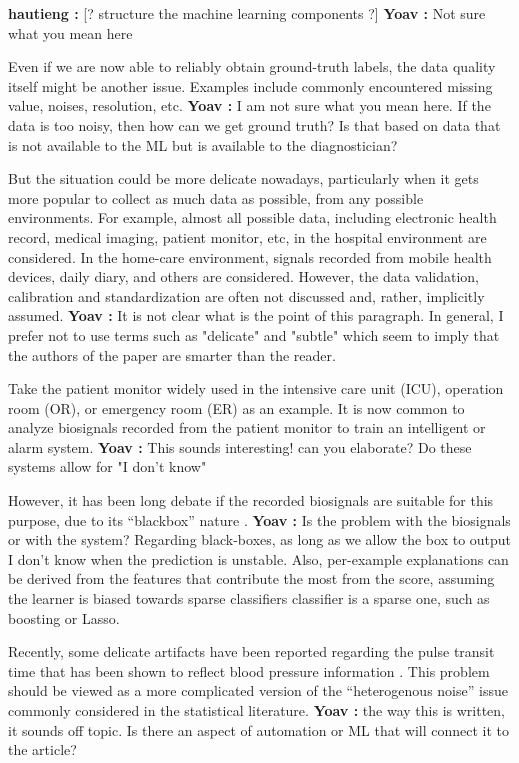 \documentclass[fleqn,10pt]{wlscirep}
\newcommand{\comment}[3]{{\color{#1} {\bf #2 :} #3}}
\newcommand{\hautieng}[1]{\comment{blue}{hautieng}{#1}}
\newcommand{\yoav}[1]{\comment{red}{Yoav}{#1}}
\begin{document}
\hautieng{
[? structure the machine learning components ?]
\yoav{Not sure what you mean here}

Even if we are now able to reliably obtain ground-truth labels, the data quality itself might be another issue. Examples include commonly encountered missing value, noises, resolution, etc. 
\yoav{I am not sure what you mean here. If the data is too noisy, then how can we get ground truth? Is that based on data that is not available to the ML but is available to the diagnostician?}

But the situation could be more delicate nowadays, particularly when it gets more popular to collect as much data as possible, from any possible environments. For example, almost all possible data, including electronic health record, medical imaging, patient monitor, etc, in the hospital environment are considered. In the home-care environment, signals recorded from mobile health devices, daily diary, and others are considered. However, the data validation, calibration and standardization are often not discussed and, rather, implicitly assumed. 
\yoav{It is not clear what is the point of this paragraph.  In general, I prefer not to use terms such as "delicate" and "subtle" which seem to imply that the authors of the paper are smarter than the reader.}

Take the patient monitor widely used in the intensive care unit (ICU), operation room (OR), or emergency room (ER) as an example. It is now common to analyze biosignals recorded from the patient monitor to train an intelligent \cite{Johnson2016} or alarm \cite{fleischman2019emergency} system.
\yoav{This sounds interesting! can you elaborate? Do these systems allow for "I don't know"}

However, it has been long debate if the recorded biosignals are suitable for this purpose, due to its ``blackbox'' nature \cite{Feldman2006,Shelley2016,Cannesson2016}. 
\yoav{Is the problem with the biosignals or with the system? Regarding black-boxes, as long as we allow the box to output I don't know when the prediction is unstable. Also, per-example explanations can be derived from the features that contribute the most from the score, assuming the learner is biased towards sparse classifiers classifier is a sparse one, such as boosting or Lasso.}

Recently, some delicate artifacts have been reported \cite{lin2019unexpected} regarding the pulse transit time that has been shown to reflect blood pressure information \cite{gesche2012continuous}. This problem should be viewed as a more complicated version of the ``heterogenous noise'' issue commonly considered in the statistical literature.
\yoav{the way this is written, it sounds off topic. Is there an aspect of automation or ML that will connect it to the article?}

}
\end{document}
